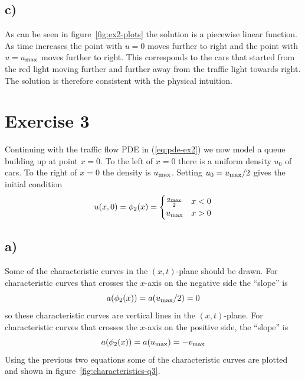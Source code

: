     \subsection*{c)}
    As can be seen in figure~\ref{fig:ex2-plots} the solution is a piecewise linear function. As time increases the point with $u=0$ moves further to right and the point with $u=u_{\text{max}}$ moves further to right. This corresponds to the cars that started from the red light moving further and further away from the traffic light towards right. The solution is therefore consistent with the physical intuition.

    \section*{Exercise 3}
    Continuing with the traffic flow PDE in (\ref{eq:pde-ex2}) we now model a queue building up at point $x=0$. To the left of $x=0$ there is a uniform density $u_0$ of cars. To the right of $x=0$ the density is $u_{\text{max}}$. Setting $u_0=u_{\text{max}}/2$ gives the initial condition
    \begin{equation*}
        u(x,0) = \phi_2(x) = \begin{cases}
            \frac{u_{\text{max}}}{2} & x < 0 \\
            u_{\text{max}} & x > 0
        \end{cases}
    \end{equation*}

    \subsection*{a)}
    Some of the characteristic curves in the $(x,t)$-plane should be drawn. For characteristic curves that crosses the $x$-axis on the negative side the ``slope'' is
    \begin{equation*}
        a(\phi_2(x)) = a(u_{\text{max}}/2) = 0
    \end{equation*}
    so these characteristic curves are vertical lines in the $(x,t)$-plane. For characteristic curves that crosses the $x$-axis on the positive side, the ``slope'' is
    \begin{equation*}
        a(\phi_2(x)) = a(u_{\text{max}}) = -v_{\text{max}}
    \end{equation*}
    Using the previous two equations some of the characteristic curves are plotted and shown in figure~\ref{fig:characteristics-q3}.

